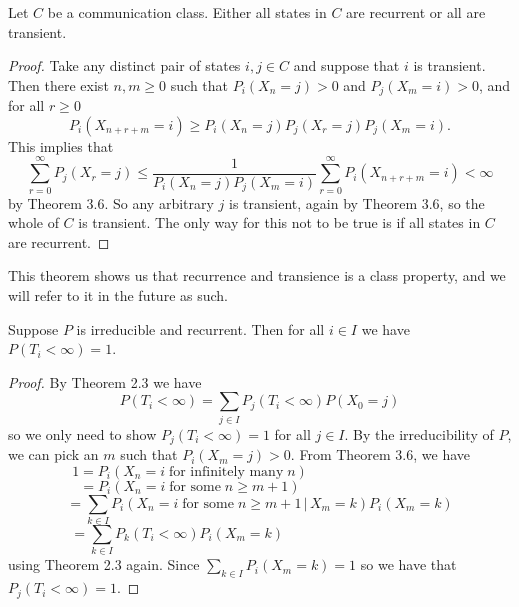 \begin{thm} Let $C$ be a communication class. Either all states in $C$ are recurrent or all are transient.
\end{thm}

\begin{proof} Take any distinct pair of states $i,j \in C$ and suppose that $i$ is transient. Then there exist $n,m\geq0$ such that $P_i(X_n=j)>0$ and $P_j(X_m=i)>0$, and for all $r\geq0$
\[P_i(X_{n+r+m}=i) \geq P_i(X_n=j)P_j(X_r=j)P_j(X_m=i).\]
This implies that
\[\sum_{r=0}^{\infty}P_j(X_r=j)\leq \frac{1}{P_i(X_n=j)P_j(X_m=i)}\sum_{r=0}^{\infty}P_i(X_{n+r+m}=i)<\infty \]
by Theorem 3.6. So any arbitrary $j$ is transient, again by Theorem 3.6, so the whole of $C$ is transient. The only way for this not to be true is if all states in $C$ are recurrent.
\end{proof}
This theorem shows us that recurrence and transience is a class property, and we will refer to it in the future as such.

\begin{thm} Suppose $P$ is irreducible and recurrent. Then for all $i \in I$ we have $P(T_i<\infty)=1$.
\end{thm}
\begin{proof} By Theorem 2.3 we have
\[P(T_i<\infty)=\sum_{j\in I}P_j(T_i<\infty)P(X_0=j)\]
so we only need to show $P_j(T_i<\infty)=1$ for all $j \in I$. By the irreducibility of $P$, we can pick an $m$ such that $P_i(X_m=j)>0$. From Theorem 3.6, we have
\[\!\!\!\!\!\!\!1=P_i(X_n=i \; \textrm{for infinitely many} \; n)\qquad\qquad\qquad\qquad\qquad\]
\[\!\!\!\!\!\!=P_i(X_n=i \; \textrm{for some} \; n\geq m+1)\qquad\qquad\qquad\qquad\qquad\]
\[=\sum_{k \in I} P_i(X_n=i \; \textrm{for some} \; n\geq m+1\,|\, X_m=k)P_i(X_m=k)\]
\[\!\!\!\!\,=\sum_{k \in I} P_k(T_i<\infty)P_i(X_m=k)\qquad\qquad\qquad\qquad\qquad\qquad\]
using Theorem 2.3 again. Since $\sum_{k \in I} P_i(X_m=k)=1$ so we have that \\$P_j(T_i<\infty)=1$.
\end{proof}
